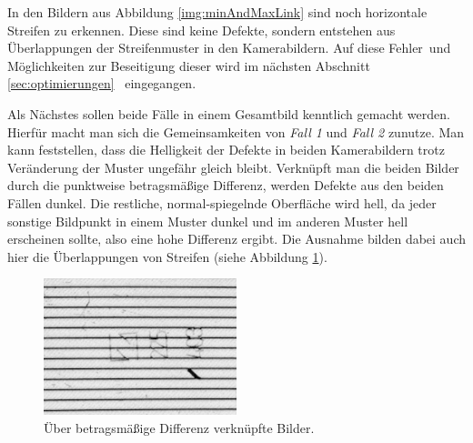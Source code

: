 \noindent
In den Bildern aus Abbildung \ref{img:minAndMaxLink} sind noch horizontale Streifen zu erkennen.
Diese sind keine Defekte, sondern entstehen aus Überlappungen der Streifenmuster in den Kamerabildern.
Auf diese \glqq Fehler\grqq ~und Möglichkeiten zur Beseitigung dieser wird im nächsten Abschnitt \ref{sec:optimierungen} ~eingegangen.

\p
Als Nächstes sollen beide Fälle in einem Gesamtbild kenntlich gemacht werden.
Hierfür macht man sich die Gemeinsamkeiten von \textit{Fall 1} und \textit{Fall 2} zunutze.
Man kann feststellen, dass die Helligkeit der Defekte in beiden Kamerabildern trotz Veränderung der Muster ungefähr gleich bleibt.
Verknüpft man die beiden Bilder durch die punktweise betragsmäßige Differenz, werden Defekte aus den beiden Fällen dunkel.
Die restliche, normal-spiegelnde Oberfläche wird hell, da jeder sonstige Bildpunkt in einem Muster dunkel und im anderen Muster hell erscheinen sollte, also eine hohe Differenz ergibt.
Die Ausnahme bilden dabei auch hier die Überlappungen von Streifen (siehe Abbildung \ref{img:diffImage}).

\begin{figure}[H]
	\centering
	\includegraphics[width=0.5\textwidth]{03_sichtpruefungDurchLichtstreuung/einsatzVonMehrerenStreifenmustern/figures/diffImage}
	\caption[Verknüpfte Bilder über Differenz]{Über betragsmäßige Differenz verknüpfte Bilder.}
	\label{img:diffImage}
\end{figure}